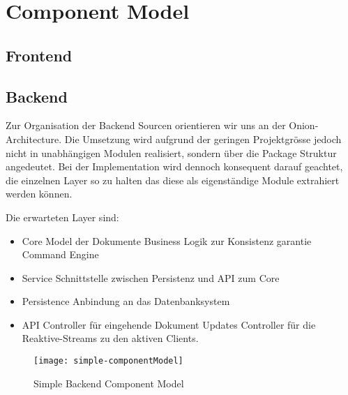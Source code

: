 \section{Component Model}



\subsection{Frontend}

\subsection{Backend}
Zur Organisation der Backend Sourcen orientieren wir uns an der Onion-Architecture.
Die Umsetzung wird aufgrund der geringen Projektgrösse jedoch nicht in unabhängigen Modulen realisiert, sondern über die Package Struktur angedeutet.
Bei der Implementation wird dennoch konsequent darauf geachtet, die einzelnen Layer so zu halten das diese als eigenständige Module extrahiert werden können.

Die erwarteten Layer sind:
\begin{itemize}
    \item Core
    \subitem Model der Dokumente
    \subitem Business Logik zur Konsistenz garantie
    \subitem Command Engine
    \item Service
    \subitem Schnittstelle zwischen Persistenz und API zum Core
    \item Persistence
    \subitem Anbindung an das Datenbanksystem
    \item API
    \subitem Controller für eingehende Dokument Updates
    \subitem Controller für die Reaktive-Streams zu den aktiven Clients.
\end{itemize}

\begin{figure}
    \texttt{[image: simple-componentModel]}
    \caption{Simple Backend Component Model}
\end{figure}

